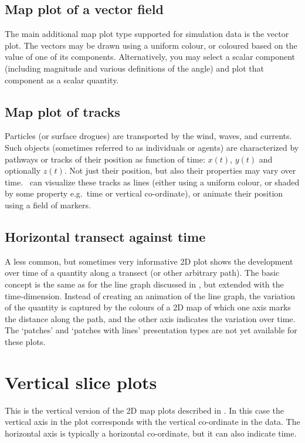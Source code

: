 \subsection{Map plot of a vector field} \label{Subsec:MapVector}
The main additional map plot type supported for simulation data is the vector plot.
The vectors may be drawn using a uniform colour, or coloured based on the value of one of its components.
Alternatively, you may select a scalar component (including magnitude and various definitions of the angle) and plot that component as a scalar quantity.

\subsection{Map plot of tracks} \label{Subsec:MapTracks}
Particles (or surface drogues) are transported by the wind, waves, and currents.
Such objects (sometimes referred to as individuals or agents) are characterized by pathways or tracks of their position as function of time: $x(t)$, $y(t)$ and optionally $z(t)$.
Not just their position, but also their properties may vary over time.
\QUICKPLOT\ can visualize these tracks as lines (either using a uniform colour, or shaded by some property e.g.~time or vertical co-ordinate), or animate their position using a field of markers.

\subsection{Horizontal transect against time} \label{Subsec:TransectTime}
A less common, but sometimes very informative 2D plot shows the development over time of a quantity along a transect (or other arbitrary path).
The basic concept is the same as for the line graph discussed in , but extended with the time-dimension.
Instead of creating an animation of the line graph, the variation of the quantity is captured by the colours of a 2D map of which one axis marks the distance along the path, and the other axis indicates the variation over time.
The `patches' and `patches with lines' presentation types are not yet available for these plots.

\section{Vertical slice plots} \label{Sec:PlotStyleSlices}
This is the vertical version of the 2D map plots described in .
In this case the vertical axis in the plot corresponds with the vertical co-ordinate in the data.
The horizontal axis is typically a horizontal co-ordinate, but it can also indicate time.

